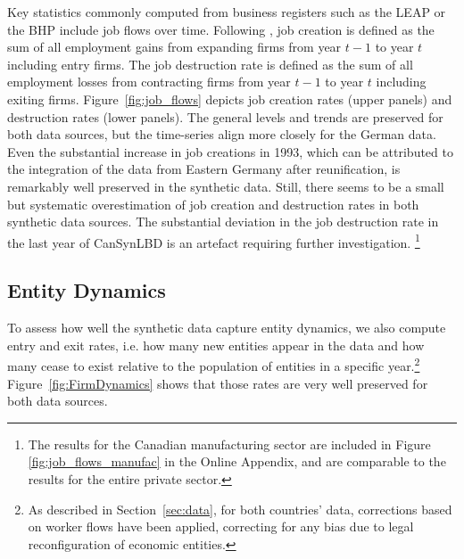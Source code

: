 Key statistics commonly computed from business registers such as the LEAP or the BHP include job flows over time. Following \citet{DavisHaltiwangerSchuh}, job creation is defined as the sum of all employment gains from expanding firms from year $t-1$ to year $t$ including entry firms. The job destruction rate is defined as the sum of all employment losses from contracting firms from year $t-1$ to year $t$ including exiting firms. Figure~\ref{fig:job_flows} depicts  job creation rates (upper panels) and destruction rates (lower panels). The general levels and trends are preserved for both data sources, but the time-series align more closely for the German data. Even the substantial increase in job creations in 1993, which can be attributed to the integration of the data from Eastern Germany after reunification, is remarkably well preserved in the synthetic data. Still, there seems to be a small but systematic overestimation of job creation and destruction rates in both synthetic data sources. The substantial deviation in the job destruction rate in the last year of CanSynLBD is an artefact  requiring further investigation.%
\footnote{The results for the Canadian manufacturing sector are included in Figure \ref{fig:job_flows_manufac} in the Online Appendix, and are comparable to the results for the entire private sector.}




\subsection{Entity Dynamics}


To assess how well the synthetic data capture entity dynamics, we also compute entry and exit rates, i.e. how many new entities appear in the data and how many cease to exist relative to the population of entities in a specific year.\footnote{As described in Section~\ref{sec:data}, for both countries' data, corrections based on worker flows have been applied, correcting for any bias due to legal reconfiguration of economic entities.} Figure~\ref{fig:FirmDynamics} shows that those rates are very well preserved for both data sources. 

